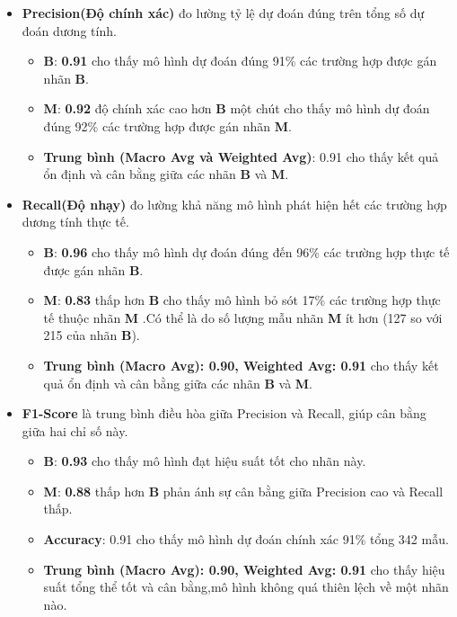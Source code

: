 \begin{itemize}
	\item \textbf{Precision(Độ chính xác)} đo lường tỷ lệ dự đoán đúng trên tổng số dự đoán dương tính.
	\begin{itemize}
		\item \textbf{B}: \textbf{0.91} cho thấy mô hình dự đoán đúng 91\% các trường hợp được gán nhãn \textbf{B}.
		\item \textbf{M}: \textbf{0.92} độ chính xác cao hơn \textbf{B} một chút cho thấy mô hình dự đoán đúng 92\% các trường hợp được gán nhãn \textbf{M}.
		\item \textbf{Trung bình (Macro Avg và Weighted Avg)}: 0.91 cho thấy kết quả ổn định và cân bằng giữa các nhãn \textbf{B} và \textbf{M}.
	\end{itemize}
	
	\item \textbf{Recall(Độ nhạy)} đo lường khả năng mô hình phát hiện hết các trường hợp dương tính thực tế.
	\begin{itemize}
		\item \textbf{B}: \textbf{0.96} cho thấy mô hình dự đoán đúng đến 96\% các trường hợp thực tế được gán nhãn \textbf{B}.
		\item \textbf{M}: \textbf{0.83} thấp hơn \textbf{B} cho thấy mô hình bỏ sót 17\% các trường hợp thực tế thuộc nhãn \textbf{M} .Có thể là do số lượng mẫu nhãn \textbf{M} ít hơn (127 so với 215 của nhãn \textbf{B}).
		\item \textbf{Trung bình (Macro Avg): 0.90, Weighted Avg: 0.91 } cho thấy kết quả ổn định và cân bằng giữa các nhãn \textbf{B} và \textbf{M}.
	\end{itemize}
	
	\item \textbf{F1-Score} là trung bình điều hòa giữa Precision và Recall, giúp cân bằng giữa hai chỉ số này. 
	\begin{itemize}
		\item \textbf{B}: \textbf{0.93} cho thấy mô hình đạt hiệu suất tốt cho nhãn này.
		\item \textbf{M}: \textbf{0.88} thấp hơn \textbf{B} phản ánh sự cân bằng giữa Precision cao và Recall thấp.
		\item \textbf{Accuracy}: 0.91 cho thấy mô hình dự đoán chính xác 91\% tổng 342 mẫu.
		\item \textbf{Trung bình (Macro Avg): 0.90, Weighted Avg: 0.91} cho thấy hiệu suất tổng thể tốt và cân bằng,mô hình không quá thiên lệch về một nhãn nào.
	\end{itemize}
	
\end{itemize}

